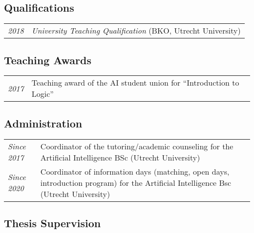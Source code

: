 \subsection*{Qualifications}

\begin{tabular}{l p{\linewidth}}
  \emph{2018} & \emph{University Teaching Qualification} (BKO, Utrecht University)
\end{tabular}

\subsection*{Teaching Awards}

\begin{tabular}{p{.1\linewidth} l}
  \emph{2017} & Teaching award of the AI student union for ``Introduction to Logic''
\end{tabular}

\subsection*{Administration}
	
\begin{tabular}{p{.15\linewidth} p{.8\linewidth}}
  \emph{Since 2017} & Coordinator of the tutoring/academic counseling for the Artificial Intelligence BSc (Utrecht University)\\
  \emph{Since 2020} & Coordinator of information days (matching, open days, introduction program) for the Artificial Intelligence Bsc (Utrecht University)
\end{tabular}

\subsection*{Thesis Supervision}

